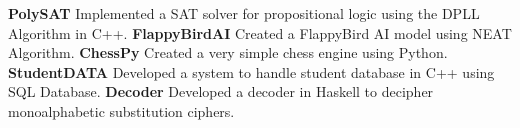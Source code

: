 \vspace{5pt}
{
	\fontsize{10pt}{1.05em}\bodyfontlight\upshape\color{text}\selectfont
	
	\begin{cvitems}
	\vspace{4pt}
	\textbf{PolySAT}
	\newline
	{Implemented a SAT solver for
		propositional logic using the
		DPLL Algorithm in C++.}
	\newline
	\textbf{FlappyBirdAI}
	\newline
	{Created a FlappyBird AI model
		using NEAT Algorithm.}
	\newline
	\textbf{ChessPy}
	\newline
	{Created a very simple chess
		engine using Python.}
	\newline
	\textbf{StudentDATA}
	\newline
	{Developed a system to handle
		student database in C++ using
		SQL Database.}
	\newline
	\textbf{Decoder}
	\newline
	{Developed a decoder in Haskell to decipher monoalphabetic substitution ciphers.}
	\end{cvitems}
}    